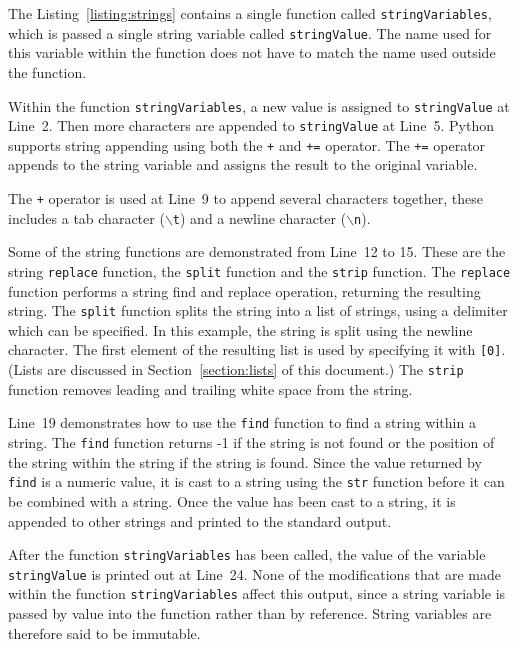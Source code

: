 \documentclass[11pt,a4paper]{article}
\begin{document}


The Listing~\ref{listing:strings} contains a single function called \texttt{stringVariables}, which is passed a single string variable called \texttt{stringValue}.  The name used for this variable within the function does not have to match the name used outside the function.

Within the function \texttt{stringVariables}, a new value is assigned to \texttt{stringValue} at Line~2.  Then more characters are appended to \texttt{stringValue} at Line~5.  Python supports string appending using both the \texttt{+} and \texttt{+=} operator.  The \texttt{+=} operator appends to the string variable and assigns the result to the original variable.

The \texttt{+} operator is used at Line~9 to append several characters together, these includes a tab character (\texttt{$\backslash$t}) and a newline character (\texttt{$\backslash$n}).

Some of the string functions are demonstrated from Line~12 to 15.  These are the string \texttt{replace} function, the \texttt{split} function and the \texttt{strip} function.  The \texttt{replace} function performs a string find and replace operation, returning the resulting string.  The \texttt{split} function splits the string into a list of strings, using a delimiter which can be specified.  In this example, the string is split using the newline character.  The first element of the resulting list is used by specifying it with \texttt{[0]}.  (Lists are discussed in Section~\ref{section:lists} of this document.)  The \texttt{strip} function removes leading and trailing white space from the string.

Line~19 demonstrates how to use the \texttt{find} function to find a string within a string.  The \texttt{find} function returns -1 if the string is not found or the position of the string within the string if the string is found.  Since the value returned by \texttt{find} is a numeric value, it is cast to a string using the \texttt{str} function before it can be combined with a string.  Once the value has been cast to a string, it is appended to other strings and printed to the standard output.

After the function \texttt{stringVariables} has been called, the value of the variable \texttt{stringValue} is printed out at Line~24.  None of the modifications that are made within the function \texttt{stringVariables} affect this output, since a string variable is passed by value into the function rather than by reference.  String variables are therefore said to be immutable.
\end{document}
